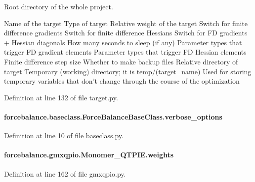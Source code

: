 Root directory of the whole project. 

Name of the target Type of target Relative weight of the target Switch for finite difference gradients Switch for finite difference Hessians Switch for F\-D gradients + Hessian diagonals How many seconds to sleep (if any) Parameter types that trigger F\-D gradient elements Parameter types that trigger F\-D Hessian elements Finite difference step size Whether to make backup files Relative directory of target Temporary (working) directory; it is temp/(target\-\_\-name) Used for storing temporary variables that don't change through the course of the optimization 

Definition at line 132 of file target.\-py.

\hypertarget{classforcebalance_1_1baseclass_1_1ForceBalanceBaseClass_a8088e1e20cbd6bc175fb9c9fe9fa0f18}{
\paragraph[{verbose\-\_\-options}]{\setlength{\rightskip}{0pt plus 5cm}forcebalance.\-baseclass.\-Force\-Balance\-Base\-Class.\-verbose\-\_\-options\hspace{0.3cm}{\ttfamily [inherited]}}}\label{classforcebalance_1_1baseclass_1_1ForceBalanceBaseClass_a8088e1e20cbd6bc175fb9c9fe9fa0f18}


Definition at line 10 of file baseclass.\-py.

\hypertarget{classforcebalance_1_1gmxqpio_1_1Monomer__QTPIE_a4cbe02eccd28b60e657bbabc08ec25e0}{
\paragraph[{weights}]{\setlength{\rightskip}{0pt plus 5cm}forcebalance.\-gmxqpio.\-Monomer\-\_\-\-Q\-T\-P\-I\-E.\-weights}}\label{classforcebalance_1_1gmxqpio_1_1Monomer__QTPIE_a4cbe02eccd28b60e657bbabc08ec25e0}


Definition at line 162 of file gmxqpio.\-py.


